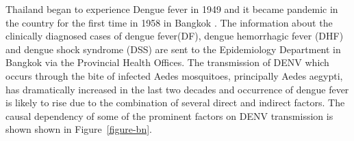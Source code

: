 \documentclass{bmcart}
\begin{document}
Thailand began to experience Dengue fever in 1949 and it became pandemic in the country for the first time in 1958 in Bangkok \cite{hammon1964virological}. The information about the clinically diagnosed cases of dengue fever(DF), dengue hemorrhagic fever (DHF) and dengue shock syndrome (DSS) are sent to the Epidemiology Department in Bangkok \cite{chareonsook1999changing} via the Provincial Health Offices. The transmission of DENV which occurs through the bite of infected Aedes mosquitoes, principally Aedes aegypti, has dramatically increased in the last two decades \cite{hesse2007dengue} and occurrence of dengue fever is likely to rise \cite{wilder2012denguetools} due to the combination of several direct and indirect factors. The causal dependency of some of the prominent factors on DENV transmission is shown shown in Figure~\ref{figure-bn}.
\end{document}
